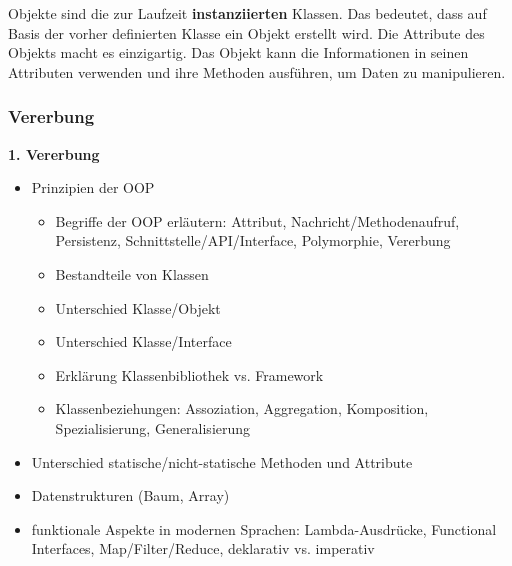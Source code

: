 Objekte sind die zur Laufzeit \textbf{instanziierten} Klassen. Das bedeutet, dass auf Basis der vorher definierten Klasse ein Objekt erstellt wird. Die Attribute des Objekts macht es einzigartig. Das Objekt kann die Informationen in seinen Attributen verwenden und ihre Methoden ausführen, um Daten zu manipulieren.

\subsubsection{Vererbung}
\textbf{1. Vererbung}\\



\begin{itemize}
	\item Prinzipien der OOP
	\begin{itemize}
		\item Begriffe der OOP erläutern: Attribut, Nachricht/Methodenaufruf, Persistenz, Schnittstelle/API/Interface, Polymorphie, Vererbung
		\item Bestandteile von Klassen
		\item Unterschied Klasse/Objekt
		\item Unterschied Klasse/Interface
		\item Erklärung Klassenbibliothek vs. Framework
		\item Klassenbeziehungen: Assoziation, Aggregation, Komposition, Spezialisierung, Generalisierung
	\end{itemize}
	\item Unterschied statische/nicht-statische Methoden und Attribute
	\item Datenstrukturen (Baum, Array)
	\item funktionale Aspekte in modernen Sprachen: Lambda-Ausdrücke, Functional Interfaces, Map/Filter/Reduce, deklarativ vs. imperativ
\end{itemize}